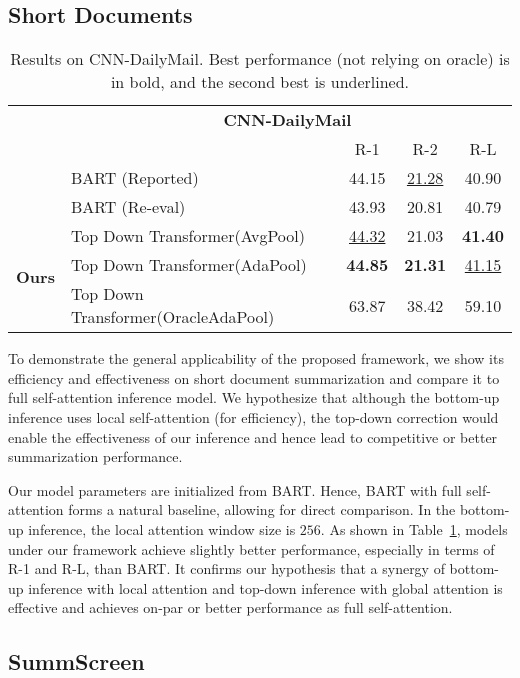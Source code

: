 \documentclass{article} \usepackage{iclr2022_conference,times}
\newcommand{\todof}{{Top Down Transformer}\xspace} \newcommand{\todofull}{{Top Down Transformer}\xspace} \newcommand\todo[1]{\textcolor{red}{(#1)}}
\begin{document}
\subsection{Short Documents}

\begin{table}[h!]
\small
\centering
\begin{tabular}{c l c c c} 
\toprule
& \multicolumn{4}{c}{\textbf{CNN-DailyMail}}\\
& & R-1 & R-2 & R-L \\
\hline
& BART (Reported) & 44.15 & \underline{21.28} & 40.90 \\ 
& BART (Re-eval) & 43.93 & 20.81 & 40.79 \\ 
\hline
\multirow{3}{*}{\bf Ours} & \todof (AvgPool) & \underline{44.32} & 21.03 & \textbf{41.40} \\ 
    & \todof (AdaPool) & \textbf{44.85} & \textbf{21.31} & \underline{41.15} \\ \cline{2-5}
    & \todof (OracleAdaPool) & 63.87 & 38.42 & 59.10 \\ 
\hline
\end{tabular}
\caption{\scriptsize Results on CNN-DailyMail. Best performance (not relying on oracle) is in bold, and the second best is underlined.}
\label{table:cnn}
\end{table}


To demonstrate the general applicability of the proposed framework, we show its efficiency and effectiveness on short document summarization and compare it to full self-attention inference model. We hypothesize that although the bottom-up inference uses local self-attention (for efficiency), the top-down correction would enable the effectiveness of our inference and hence lead to competitive or better summarization performance. 


Our model parameters are initialized from BART. Hence, BART with full self-attention forms a natural baseline, allowing for direct comparison. In the bottom-up inference, the local attention window size is $256$. As shown in Table~\ref{table:cnn}, models under our framework achieve slightly better performance, especially in terms of R-1 and R-L, than BART. It confirms our hypothesis that a synergy of bottom-up inference with local attention and top-down inference with global attention is effective and achieves on-par or better performance as full self-attention.




\subsection{SummScreen}
\end{document}
